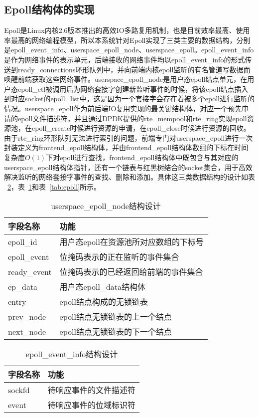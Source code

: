 \subsection{Epoll结构体的实现}
Epoll是Linux内核2.6版本推出的高效IO多路复用机制，也是目前效率最高、使用率最高的网络编程模型，所以本系统针对Epoll实现了三类主要的数据结构，分别是epoll\_event\_info、userspace\_epoll\_node、userspace\_epoll。epoll\_event\_info是作为网络事件的表示单元，后端接收的网络事件均以epoll\_event\_info的形式传送到ready\_connections环形队列中，并向前端内核epoll监听的有名管道写数据而唤醒前端获取这些网络事件。userspace\_epoll\_node是用户态epoll结点单元，在用户态epoll\_ctl被调用后为网络套接字创建新监听事件的时候，将该epoll结点插入到对应socket的epoll\_list中，这是因为一个套接字会存在着被多个epoll进行监听的情况。userspace\_epoll作为前后端IO复用实现的最关键结构体，对应一个预先申请的epoll文件描述符，并且通过DPDK提供的rte\_mempool和rte\_ring实现epoll资源池，在epoll\_create时候进行资源的申请，在epoll\_close时候进行资源的回收。由于rte\_ring环形队列无法进行索引的问题，前端专门对userspace\_epoll进行一次封装定义为frontend\_epoll结构体，并由frontend\_epoll结构体数组的下标在时间复杂度$O(1)$下对epoll进行查找，frontend\_epoll结构体中既包含与其对应的userspace\_epoll结构体指针，还有一个链表与红黑树结合的socket集合，用于高效解决监听的网络套接字事件的查找、删除和添加。具体这三类数据结构的设计如表 ~\ref{tab:epoll_event}，表~\ref{tab:epoll_node}和表~\ref{tab:epoll}所示。

\begin{table}[]
\centering
\caption{userspace\_epoll\_node结构设计}
\label{tab:epoll_node}
\begin{tabular}{ll}
\toprule[1.5pt]
\textbf{字段名称} & \textbf{功能} \\
\midrule[1pt]
epoll\_id & 用户态epoll在资源池所对应数组的下标号 \\
epoll\_event & 位掩码表示的正在监听的事件集合 \\
ready\_event & 位掩码表示的已经返回给前端的事件集合 \\
ep\_data & 用户态epoll\_data结构体 \\
entry & epoll结点构成的无锁链表 \\
prev\_node & epoll结点无锁链表的上一个结点 \\
next\_node & epoll结点无锁链表的下一个结点 \\
\bottomrule[1.5pt]
\end{tabular}
\end{table}

\begin{table}[]
\centering
\caption{epoll\_event\_info结构设计}
\label{tab:epoll_event}
\begin{tabular}{ll}
\toprule[1.5pt]
\textbf{字段名称} & \textbf{功能} \\ 
\midrule[1pt]
sockfd & 待响应事件的文件描述符 \\
event & 待响应事件的位域标识符 \\
\bottomrule[1.5pt]
\end{tabular}
\end{table}


